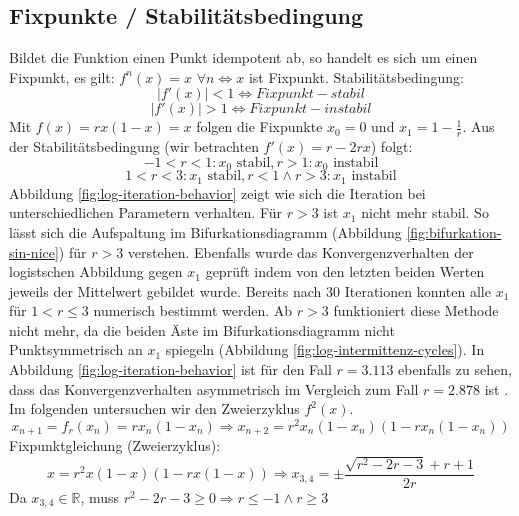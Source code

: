 \documentclass[12pt,a4paper]{article}
\begin{document}
\subsection{Fixpunkte / Stabilitätsbedingung}
Bildet die Funktion einen Punkt idempotent ab, so handelt es sich um einen Fixpunkt, es gilt: $f^n(x)=x$ $\forall n \iff x$ ist Fixpunkt. 
Stabilitätsbedingung:
\begin{equation} |f'(x)|<1 \iff Fixpunkt-stabil \end{equation}
\begin{equation} |f'(x)|>1 \iff Fixpunkt-instabil \end{equation}
Mit $ f(x)=rx(1-x)=x $ folgen die Fixpunkte $x_{0}=0$ und $x_{1}=1-\frac{1}{r}$. Aus der Stabilitätsbedingung (wir betrachten $f'(x)=r-2rx$) folgt:
\begin{equation}
-1 < r < 1: x_{0} \text{ stabil}, r > 1: x_{0} \text{ instabil}
\end{equation}
\begin{equation}
1 < r < 3: x_1 \text{ stabil}, r<1 \wedge  r> 3: x_1 \text{ instabil}
\end{equation}
Abbildung \ref{fig:log-iteration-behavior} zeigt wie sich die Iteration bei unterschiedlichen Parametern verhalten. Für $r>3$ ist $x_1$ nicht mehr stabil. So lässt sich die Aufspaltung im Bifurkationsdiagramm (Abbildung \ref{fig:bifurkation-sin-nice}) für $r>3$ verstehen. Ebenfalls wurde das Konvergenzverhalten der logistschen Abbildung gegen $x_1$ geprüft indem von den letzten beiden Werten jeweils der Mittelwert gebildet wurde. Bereits nach 30 Iterationen konnten alle $x_1$ für $1 < r \leq 3$ numerisch bestimmt werden. Ab $r>3$ funktioniert diese Methode nicht mehr, da die beiden Äste im Bifurkationsdiagramm nicht Punktsymmetrisch an $x_1$ spiegeln (Abbildung \ref{fig:log-intermittenz-cycles}). In Abbildung \ref{fig:log-iteration-behavior} ist für den Fall $r=3.113$ ebenfalls zu sehen, dass das Konvergenzverhalten asymmetrisch im Vergleich zum Fall $r=2.878$ ist .
Im folgenden untersuchen wir den Zweierzyklus $f^2(x)$.
\begin{equation}x_{n+1}=f_r(x_n)=rx_n(1-x_n)
\Rightarrow x_{n+2}=r^2x_n(1-x_n)(1-rx_n(1-x_n))\end{equation}
\newline
Fixpunktgleichung (Zweierzyklus):
\begin{equation}
x=r^2x(1-x)(1-rx(1-x))
\Rightarrow 
x_{3,4}=\pm\frac{\sqrt{r^2-2 r-3}+r+1}{2 r}
\end{equation}
Da $x_{3,4} \in \mathbb{R} $, muss $r^2-2 r-3 \geq 0 \Rightarrow r \leq -1 \land r \geq 3$
\end{document}
